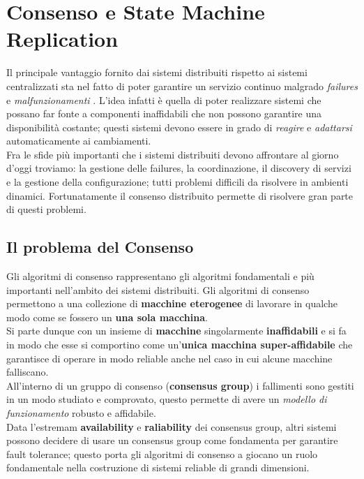 \chapter{Consenso e State Machine Replication}
Il principale vantaggio fornito dai sistemi distribuiti rispetto ai sistemi centralizzati sta nel fatto di poter garantire un servizio continuo malgrado \textit{failures} e \textit{malfunzionamenti} \cite[Friedman:1996]{Friedman:1996}.
L'idea infatti è quella di poter realizzare sistemi che possano far fonte a componenti inaffidabili che non possono garantire una disponibilità costante; questi sistemi devono essere in grado di \textit{reagire} e \textit{adattarsi} automaticamente ai cambiamenti.\\
Fra le sfide più importanti che i sistemi distribuiti devono affrontare al giorno d'oggi troviamo: la gestione delle failures, la coordinazione, il discovery di servizi e la gestione della configurazione; tutti problemi difficili da risolvere in ambienti dinamici. Fortunatamente il consenso distribuito permette di risolvere gran parte di questi problemi.
	
	\section{Il problema del Consenso}
	Gli algoritmi di consenso rappresentano gli algoritmi fondamentali e più importanti nell'ambito dei sistemi distribuiti.
	Gli algoritmi di consenso permettono a una collezione di \textbf{macchine eterogenee} di lavorare in qualche modo come se fossero un \textbf{una sola macchina}.\\
	Si parte dunque con un insieme di \textbf{macchine} singolarmente \textbf{inaffidabili} e si fa in modo che esse si comportino come un'\textbf{unica macchina super-affidabile} che garantisce di operare in modo reliable anche nel caso in cui alcune macchine falliscano.\\
	All'interno di un gruppo di consenso (\textbf{consensus group}) i fallimenti sono gestiti in un modo studiato e comprovato, questo permette di avere un \textit{modello di funzionamento} robusto e affidabile.\\
	Data l'estremam \textbf{availability} e \textbf{raliability} dei consensus group, altri sistemi possono decidere di usare un consensus group come fondamenta per garantire fault tolerance; questo porta gli algoritmi di consenso a giocano un ruolo fondamentale nella costruzione di sistemi reliable di grandi dimensioni. 

